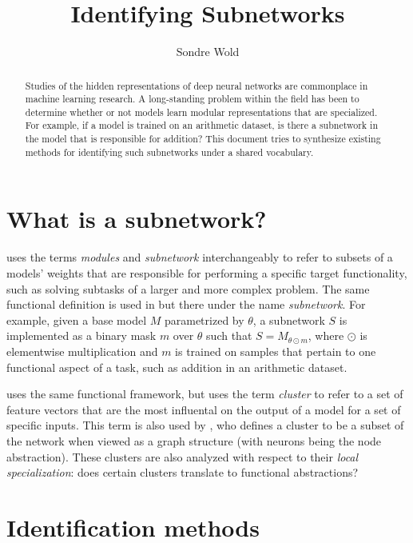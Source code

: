 \documentclass[11pt]{article}
\title{Identifying Subnetworks}
\author{Sondre Wold}
\begin{document}
\maketitle

\begin{abstract}
\noindent
Studies of the hidden representations of deep neural networks are commonplace in machine learning research. A long-standing problem within the field has been to determine whether or not models learn modular representations that are specialized. For example, if a model is trained on an arithmetic dataset, is there a subnetwork in the model that is responsible for addition? This document tries to synthesize existing methods for identifying such subnetworks under a shared vocabulary.
\end{abstract}

\section{What is a subnetwork?}

\citet{csordas2020neural} uses the terms \textit{modules} and \textit{subnetwork} interchangeably to refer to subsets of a models' weights that are responsible for performing a specific target functionality, such as solving subtasks of a larger and more complex problem. The same functional definition is used in \citet{lepori2023break} but there under the name \textit{subnetwork}. For example, given a base model $M$ parametrized by $\theta$, a subnetwork $S$ is implemented as a binary mask $m$ over $\theta$ such that $S=M_{\theta \odot m}$, where $\odot$ is elementwise multiplication and $m$ is trained on samples that pertain to one functional aspect of a task, such as addition in an arithmetic dataset.

\citet{watanabe2019interpreting} uses the same functional framework, but uses the term \textit{cluster} to refer to a set of feature vectors that are the most influental on the output of a model for a set of specific inputs. This term is also used by \citet{casper2022graphical}, who defines a cluster to be a subset of the network when viewed as a graph structure (with neurons being the node abstraction). These clusters are also analyzed with respect to their \textit{local specialization}: does certain clusters translate to functional abstractions?

\section{Identification methods}
\end{document}

